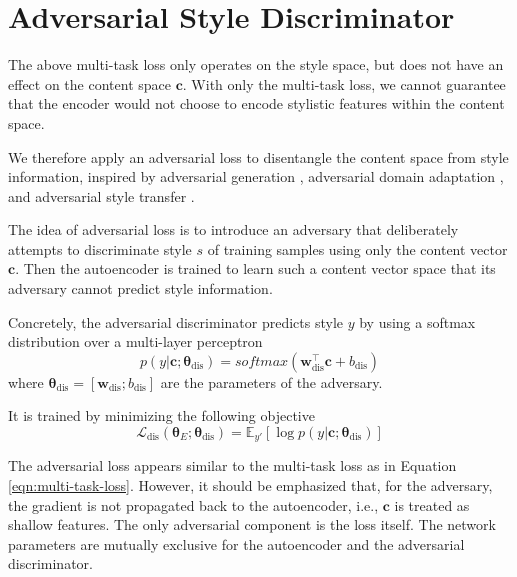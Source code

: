 \section{Adversarial Style Discriminator} \label{ssec:adversarial-style-objective}

The above multi-task loss only operates on the style space, but does not have an effect on the content space $\bm c$. With only the multi-task loss, we cannot guarantee that the encoder would not choose to encode stylistic features within the content space.

We therefore apply an adversarial loss to disentangle the content space from style information, inspired by adversarial generation \citep{goodfellow2014generative}, adversarial domain adaptation \citep{liu2017adversarial}, and adversarial style transfer \citep{fu2017style}.

The idea of adversarial loss is to introduce an adversary that deliberately attempts to discriminate style $s$ of training samples using only the content vector $\bm c$. Then the autoencoder is trained to learn such a content vector space that its adversary cannot predict style information.

Concretely, the adversarial discriminator predicts style $y$ by using a softmax distribution over a multi-layer perceptron
\begin{equation}
	p(y | \bm c; \bm\theta_\text{dis}) = softmax(\bm w_\text{dis}^\top \bm c + b_\text{dis})
\end{equation}
where $\bm\theta_\text{dis}=[\bm w_\text{dis}; b_\text{dis}]$ are the parameters of the adversary.

It is trained by minimizing the following objective
\begin{equation} \label{eqn:adv-disc-loss}
	\mathcal{L}_\text{dis}(\bm\theta_{E};\bm\theta_\text{dis}) =
	\mathbb{E}_{y'} [\log p(y | \bm c; \bm\theta_\text{dis})]
\end{equation}

The adversarial loss appears similar to the multi-task loss as in Equation \ref{eqn:multi-task-loss}. However, it should be emphasized that, for the adversary, the gradient is not propagated back to the autoencoder, i.e., $\bm c$ is treated as shallow features. The only adversarial component is the loss itself. The network parameters are mutually exclusive for the autoencoder and the adversarial discriminator.


